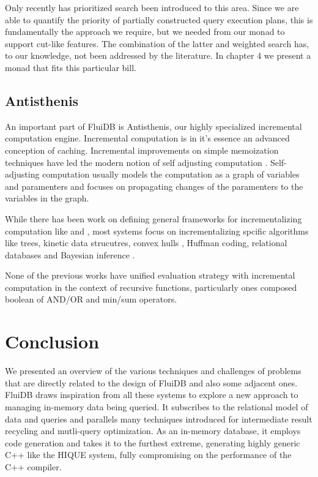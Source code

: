 Only recently \cite{kidneyAlgebrasWeightedSearch2021} has prioritized
search been introduced to this area. Since we are able to quantify the
priority of partially constructed query execution plans, this is
fundamentally the approach we require, but we needed from our monad to
support cut-like features. The combination of the latter and weighted
search has, to our knowledge, not been addressed by the literature. In
chapter 4 we present a monad that fits this particular bill.

\subsection{Antisthenis}
\label{sec:orgb080363}

An important part of FluiDB is Antisthenis, our highly specialized
incremental computation engine. Incremental computation is in it's
essence an advanced conception of caching. Incremental improvements on
simple memoization techniques
\cite{pughIncrementalComputationFunction1989} have led the modern
notion of self adjusting computation
\cite{acarSelfadjustingComputation2005}. Self-adjusting computation
usually models the computation as a graph of variables and paramenters
and focuses on propagating changes of the paramenters to the variables
in the graph.

While there has been work on defining general frameworks for
incrementalizing computation like
\cite{hammerAdaptonComposableDemanddriven2014a} and
\cite{andersonEfficientParallelSelfadjusting2021a}, most systems focus
on incrementalizing spcific algorithms like
trees\cite{acarDynamizingStaticAlgorithms2004}, kinetic data
strucutres\cite{acarKineticAlgorithmsSelfadjusting2006}, convex hulls
\cite{acarExperimentalAnalysisSelfadjusting2009}, Huffman
coding\cite{acarTraceableDataTypes2010}, relational databases
\cite{hornIncrementalRelationalLenses2018} and Bayesian inference
\cite{acarAdaptiveBayesianInference2007}.



None of the previous works have unified evaluation strategy with
incremental computation in the context of recursive functions,
particularly ones composed boolean of AND/OR and min/sum operators.


\section{Conclusion}

We presented an overview of the various techniques and challenges of
problems that are directly related to the design of FluiDB and also
some adjacent ones. FluiDB draws inspiration from all these systems to
explore a new approach to managing in-memory data being queried. It
subscribes to the relational model of data and queries and parallels
many techniques introduced for intermediate result recycling and mutli-query
optimization. As an in-memory database, it employs code
generation and takes it to the furthest extreme, generating highly
generic C++ like the HIQUE system, fully compromising on the
performance of the C++ compiler.

